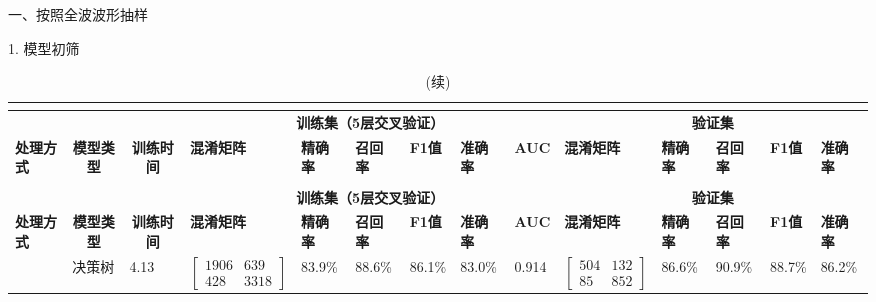 一、按照全波波形抽样

1. 模型初筛

\begin{landscape}
      \begin{longtable}{m{1.5cm}<{\centering}m{1.5cm}<{\centering}m{1.5cm}<{\centering}m{2cm}<{\centering}m{1cm}<{\centering}m{1cm}<{\centering}m{1cm}<{\centering}m{1cm}<{\centering}m{1cm}<{\centering}m{2cm}<{\centering}m{1cm}<{\centering}m{1cm}<{\centering}m{1cm}<{\centering}m{1cm}<{\centering}}
            \caption{初筛结果}\\
            \label{tab:model_screen3}\\
            \toprule
                  & \multicolumn{1}{c}{}   & \multicolumn{1}{c}{}  & \multicolumn{6}{c}{\textbf{训练集（5层交叉验证）}}   & \multicolumn{5}{c}{\textbf{验证集}}     \\
            \multirow{-2}{*}{\textbf{处理方式}}  & \multicolumn{1}{c}{\multirow{-2}{*}{\textbf{模型类型}}} & \multicolumn{1}{c}{\multirow{-2}{*}{\textbf{训练时间}}} & \textbf{混淆矩阵} & \textbf{精确率} & \textbf{召回率}& \textbf{F1值} & \textbf{准确率}& \textbf{AUC} & \textbf{混淆矩阵}& \textbf{精确率} & \textbf{召回率} & \textbf{F1值}& \textbf{准确率} \\
            \midrule
            \endfirsthead
            \caption[]{(续)}\\
            \midrule
                  & \multicolumn{1}{c}{}   & \multicolumn{1}{c}{}  & \multicolumn{6}{c}{\textbf{训练集（5层交叉验证）}}   & \multicolumn{5}{c}{\textbf{验证集}}                                                                                                                                                                                                    \\
            \multirow{-2}{*}{\textbf{处理方式}}  & \multicolumn{1}{c}{\multirow{-2}{*}{\textbf{模型类型}}} & \multicolumn{1}{c}{\multirow{-2}{*}{\textbf{训练时间}}} & \textbf{混淆矩阵} & \textbf{精确率} & \textbf{召回率}& \textbf{F1值} & \textbf{准确率}& \textbf{AUC} & \textbf{混淆矩阵}& \textbf{精确率} & \textbf{召回率} & \textbf{F1值}& \textbf{准确率} \\
            \midrule
            \endhead 
            \midrule
            \endfoot
            \bottomrule
            \endlastfoot
            & 决策树      & 4.13    & $\left[ \begin{array}{cc} 1906 & 639 \\ 428 & 3318 \end{array} \right]$ & 83.9\%  & 88.6\%  & 86.1\% & 83.0\% & 0.914    & $\left[ \begin{array}{cc} 504 & 132 \\ 85 & 852 \end{array} \right]$ & 86.6\%  & 90.9\%  & 88.7\% & 86.2\% \\

\end{longtable}
\end{landscape}

